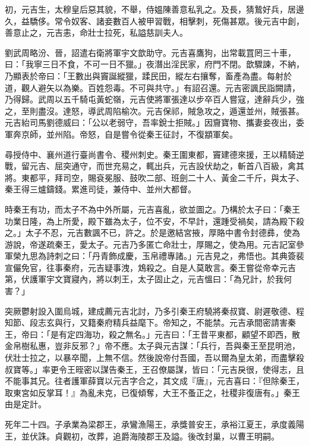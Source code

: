 \begin{pinyinscope}
 初，元吉生，太穆皇后惡其貌，不舉，侍媼陳善意私乳之。及長，猜鷙好兵，居邊久，益驕侈。常令奴客、諸妾數百人被甲習戰，相擊刺，死傷甚眾。後元吉中創，善意止之，元吉恚，命壯士拉死，私謚慈訓夫人。



 劉武周略汾、晉，詔遣右衛將軍宇文歆助守。元吉喜鷹狗，出常載罝罔三十車，曰：「我寧三日不食，不可一日不獵。」夜潛出淫民家，府門不閉。歆驟諫，不納，乃顯表於帝曰：「王數出與竇誕縱獵，蹂民田，縱左右攘奪，畜產為盡。每射於道，觀人避矢以為樂。百姓怨毒。不可與共守。」有詔召還。元吉密諷民詣闕請，乃得歸。武周以五千騎屯黃蛇嶺，元吉使將軍張達以步卒百人嘗寇，達辭兵少，強之，至則盡沒。達怒，導武周陷榆次。元吉保祁，賊急攻之，遁還並州，賊張甚。元吉紿司馬劉德威曰：「公以老弱守，吾率銳士拒賊。」因齎寶物、攜妻妾夜出，委軍奔京師，並州陷。帝怒，自是嘗令從秦王征討，不復顓軍矣。



 尋授侍中、襄州道行臺尚書令、稷州刺史。秦王圍東都，竇建德來援，王以精騎逆戰，留元吉、屈突通守，而世充易之，輒出兵，元吉設伏劫之，斬首八百級，禽其將。東都平，拜司空，賜袞冕服、鼓吹二部、班劍二十人、黃金二千斤，與太子、秦王得三爐鑄錢。累進司徒，兼侍中、並州大都督。



 時秦王有功，而太子不為中外所屬，元吉喜亂，欲並圖之。乃構於太子曰：「秦王功業日隆，為上所愛，殿下雖為太子，位不安，不早計，還踵受禍矣，請為殿下殺之。」太子不忍，元吉數諷不已，許之。於是邀結宮掖，厚賂中書令封德彞，使為游說，帝遂疏秦王，愛太子。元吉乃多匿亡命壯士，厚賜之，使為用。元吉記室參軍榮九思為詩刺之曰：「丹青飾成慶，玉帛禮專諸。」元吉見之，弗悟也。其典簽裴宣儼免官，往事秦府，元吉疑事洩，鴆殺之。自是人莫敢言。秦王嘗從帝幸元吉第，伏護軍宇文寶寢內，將以刺王，太子固止之，元吉慍曰：「為兄計，於我何害？」



 突厥鬱射設入圍烏城，建成薦元吉北討，乃多引秦王府驍將秦叔寶、尉遲敬德、程知節、段志玄與行，又籍秦府精兵益麾下。帝知之，不能禁。元吉承間密請害秦王，帝曰：「是有定四海功，殺之無名。」元吉曰：「王昔平東都，顧望不即西，散金帛樹私惠，豈非反邪？」帝不應。太子與元吉謀：「兵行，吾與秦王至昆明池，伏壯士拉之，以暴卒聞，上無不信。然後說帝付吾國，吾以爾為皇太弟，而盡擊殺叔寶等。」率更令王晊密以謀告秦王，王召僚屬謀，皆曰：「元吉戾很，使得志，且不能事其兄。往者護軍薛寶以元吉字合之，其文成『唐』，元吉喜曰：『但除秦王，取東宮如反掌耳！』為亂未克，已復傾奪，大王不蚤正之，社稷非復唐有。」秦王由是定計。



 死年二十四。子承業為梁郡王，承鸞漁陽王，承獎普安王，承裕江夏王，承度義陽王，並伏誅。貞觀初，改葬，追爵海陵郡王及謚。後改封巢，以曹王明嗣。




\end{pinyinscope}
